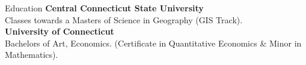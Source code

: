 \documentclass{bluefin_cv}
\begin{document}
\begin{bfcvSection}{Education}
{\bf Central Connecticut State University}
\\ Classes towards a Masters of Science in Geography (GIS Track).\hfill\\
{\bf University of Connecticut}
\\ Bachelors of Art, Economics. (Certificate in Quantitative Economics \& Minor in Mathematics).\hfill\\
\end{bfcvSection}

\end{document}
